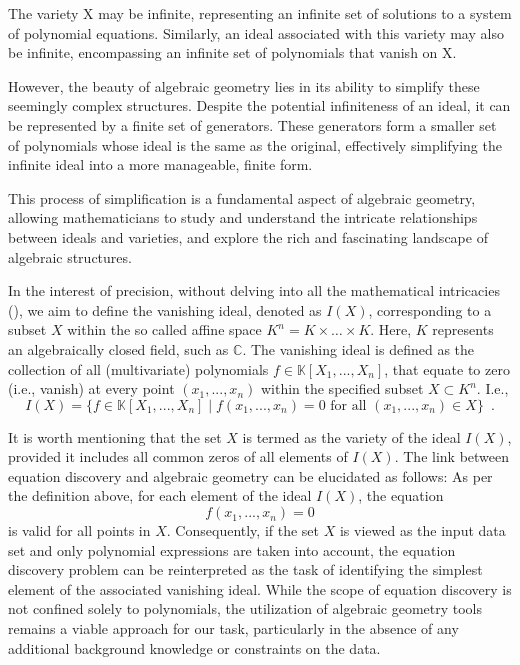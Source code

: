 \documentclass[runningheads]{llncs}
\begin{document}
The variety X may be infinite, representing an infinite set of solutions to a system of polynomial equations. Similarly, an ideal associated with this variety may also be infinite, encompassing an infinite set of polynomials that vanish on X.

However, the beauty of algebraic geometry lies in its ability to simplify these seemingly complex structures. Despite the potential infiniteness of an ideal, it can be represented by a finite set of generators. These generators form a smaller set of polynomials whose ideal is the same as the original, effectively simplifying the infinite ideal into a more manageable, finite form.

This process of simplification is a fundamental aspect of algebraic geometry, allowing mathematicians to study and understand the intricate relationships between ideals and varieties, and explore the rich and fascinating landscape of algebraic structures.


In the interest of precision, without delving into all the mathematical intricacies 
(\cite{Shafarevich}), 
we aim to define the vanishing ideal, denoted as $I(X)$, 
corresponding to a subset $X$ within the so called affine space 
  $K^n = K\times \dots \times K$.
Here, $K$ represents an algebraically closed field, such as $\mathbb{C}$. 
The vanishing ideal is defined as the collection of all 
(multivariate) polynomials $ f \in \mathbb{K}[X_1, ..., X_n]$,
that equate to 
zero (i.e., vanish) at every point $(x_1, ..., x_n)$ within 
the specified subset $ X \subset K^n$.
I.e., 
$$ I(X) = \{ f \in \mathbb{K}[X_1, ..., X_n] \mid f(x_1, ..., x_n) = 0 \text{ for all } (x_1, ..., x_n) \in X \}\enspace. $$


It is worth mentioning
that the set $X$ is termed as the variety of the ideal $I(X)$, 
provided it includes all common zeros of all elements of $I(X)$. 
The link between equation discovery and algebraic geometry can be elucidated as 
follows: As per the definition above, for each element of the ideal $I(X)$, 
the equation
$$ f(x_1,...,x_n)=0 $$
is valid for all points in $X$. 
Consequently, if the set $X$ is viewed as the input data set and only polynomial expressions are taken into account, 
the equation discovery problem can be reinterpreted as the task of identifying the simplest element of the associated vanishing ideal. 
While the scope of equation discovery is not confined solely to polynomials, the utilization of algebraic geometry tools remains a viable approach for our task, 
particularly in the absence of any additional background knowledge or constraints on the data.
\end{document}

